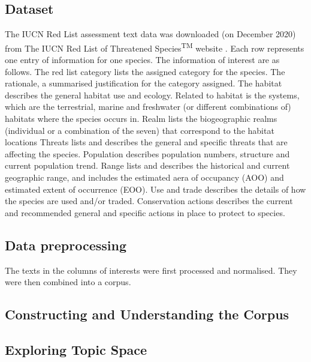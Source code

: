 \subsection{Dataset}

The IUCN Red List assessment text data was downloaded (on December 2020) from The IUCN Red List of Threatened Species\textsuperscript{TM} website \parencite{iucn2020}. Each row represents one entry of information for one species. The information of interest are as follows. 
The red list category lists the assigned category for the species. 
The rationale, a summarised justification for the category assigned. 
The habitat describes the general habitat use and ecology. 
Related to habitat is the systems, which are the terrestrial, marine and freshwater (or different combinations of) habitats where the species occurs in.
Realm lists the biogeographic realms (individual or a combination of the seven) that correspond to the habitat locations
Threats lists and describes the general and specific threats that are affecting the species. 
Population describes population numbers, structure and current population trend. 
Range lists and describes the historical and current geographic range, and includes the estimated aera of occupancy (AOO) and estimated extent of occurrence (EOO). 
Use and trade describes the details of how the species are used and/or traded.
Conservation actions describes the current and recommended general and specific actions in place to protect to species. 


\subsection{Data preprocessing}

The texts in the columns of interests were first processed and normalised. They were then combined into a corpus.

\subsection{Constructing and Understanding the Corpus}

\subsection{Exploring Topic Space}


